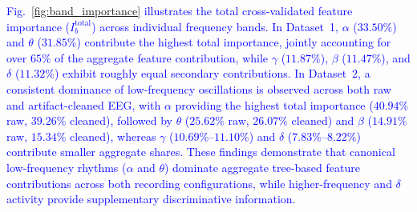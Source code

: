\documentclass[conference]{IEEEtran}
\begin{document}
\textcolor{blue}{Fig.~\ref{fig:band_importance} illustrates the total cross-validated feature importance ($I_b^{\mathrm{total}}$) across individual frequency bands. In Dataset~1, $\alpha$ ($33.50\%$) and $\theta$ ($31.85\%$) contribute the highest total importance, jointly accounting for over $65\%$ of the aggregate feature contribution, while $\gamma$ ($11.87\%$), $\beta$ ($11.47\%$), and $\delta$ ($11.32\%$) exhibit roughly equal secondary contributions. In Dataset~2, a consistent dominance of low-frequency oscillations is observed across both raw and artifact-cleaned EEG, with $\alpha$ providing the highest total importance ($40.94\%$ raw, $39.26\%$ cleaned), followed by $\theta$ ($25.62\%$ raw, $26.07\%$ cleaned) and $\beta$ ($14.91\%$ raw, $15.34\%$ cleaned), whereas $\gamma$ ($10.69\%\text{--}11.10\%$) and $\delta$ ($7.83\%\text{--}8.22\%$) contribute smaller aggregate shares. These findings demonstrate that canonical low-frequency rhythms ($\alpha$ and $\theta$) dominate aggregate tree-based feature contributions across both recording configurations, while higher-frequency and $\delta$ activity provide supplementary discriminative information.}
\end{document}
